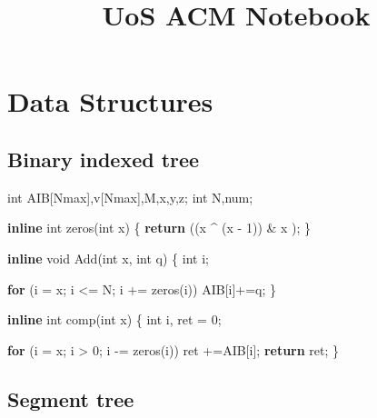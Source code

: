 \documentclass[10pt,]{article}
\title{UoS ACM Notebook}
\author{}
\date{}
\newenvironment{Shaded}{}{}
\newcommand{\KeywordTok}[1]{\textcolor[rgb]{0.00,0.44,0.13}{\textbf{{#1}}}}
\newcommand{\DataTypeTok}[1]{\textcolor[rgb]{0.56,0.13,0.00}{{#1}}}
\newcommand{\DecValTok}[1]{\textcolor[rgb]{0.25,0.63,0.44}{{#1}}}
\newcommand{\NormalTok}[1]{{#1}}
\begin{document}
\maketitle

{
\hypersetup{linkcolor=black}
\tableofcontents
}
\section{Data Structures}

\subsection{Binary indexed tree}

\begin{Shaded}
\begin{Highlighting}[]
\DataTypeTok{int} \NormalTok{AIB[Nmax],v[Nmax],M,x,y,z;}
\DataTypeTok{int} \NormalTok{N,num;}

\KeywordTok{inline} \DataTypeTok{int} \NormalTok{zeros(}\DataTypeTok{int} \NormalTok{x)}
\NormalTok{\{}
  \KeywordTok{return} \NormalTok{((x ^ (x - }\DecValTok{1}\NormalTok{)) & x );}
\NormalTok{\}}

\KeywordTok{inline} \DataTypeTok{void} \NormalTok{Add(}\DataTypeTok{int} \NormalTok{x, }\DataTypeTok{int} \NormalTok{q)}
\NormalTok{\{}
  \DataTypeTok{int} \NormalTok{i;}

  \KeywordTok{for} \NormalTok{(i = x; i <= N; i += zeros(i))}
    \NormalTok{AIB[i]+=q;}
\NormalTok{\}}

\KeywordTok{inline} \DataTypeTok{int} \NormalTok{comp(}\DataTypeTok{int} \NormalTok{x)}
\NormalTok{\{}
  \DataTypeTok{int} \NormalTok{i, ret = }\DecValTok{0}\NormalTok{;}

  \KeywordTok{for} \NormalTok{(i = x; i > }\DecValTok{0}\NormalTok{; i -= zeros(i))}
    \NormalTok{ret +=AIB[i];}
  \KeywordTok{return} \NormalTok{ret;}
\NormalTok{\}}
\end{Highlighting}
\end{Shaded}

\subsection{Segment tree}
\end{document}

